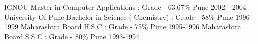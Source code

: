 

\begin{cventries}

  \cventry    
    {IGNOU}
    {Master in Computer Applications : Grade -  63.67\%}
    {Pune}
    {2002 - 2004}
    {      
    }
  \vspace{-2mm}
  \cventry    
    {University Of Pune}
    {Bachelor in Science ( Chemistry) : Grade - 58\%}
    {Pune}
    {1996 - 1999}
    {      
    }
  \vspace{-2mm}
  \cventry  
    {Maharashtra Board}
    {H.S.C : Grade - 75\%}
    {Pune}
    {1995-1996}
    {
    }
  \vspace{-2mm}
  \cventry    
    {Maharashtra Board}
    {S.S.C : Grade - 80\%}
    {Pune}
    {1993-1994}
    {
    }    
    \vspace{-2mm}  
\end{cventries}
